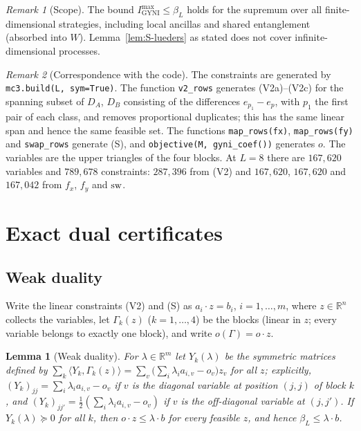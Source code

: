 \documentclass[aps,pra,onecolumn,notitlepage,superscriptaddress,longbibliography,nofootinbib,11pt]{revtex4-2}
\newtheorem{lemma}{Lemma}
\theoremstyle{remark}
\newtheorem{remark}{Remark}
\newcommand{\RR}{\mathbb{R}}
\newcommand{\Imax}{I_{\mathrm{GYNI}}^{\max}}
\newcommand{\file}[1]{\texttt{#1}}
\begin{document}
\begin{remark}[Scope]
The bound $\Imax\le\beta_L$ holds for the supremum over all finite-dimensional strategies, including local ancillas and shared entanglement (absorbed into $W$). Lemma~\ref{lem:S-lueders} as stated does not cover infinite-dimensional processes.
\end{remark}

\begin{remark}[Correspondence with the code]\label{rem:code}
The constraints are generated by \file{mc3.build(L, sym=True)}. The function \file{v2\_rows} generates (V2a)--(V2c) for the spanning subset of $D_A$, $D_B$ consisting of the differences $e_{p_1}-e_p$, with $p_1$ the first pair of each class, and removes proportional duplicates; this has the same linear span and hence the same feasible set. The functions \file{map\_rows(fx)}, \file{map\_rows(fy)} and \file{swap\_rows} generate (S), and \file{objective(M, gyni\_coef())} generates $o$. The variables are the upper triangles of the four blocks. At $L=8$ there are $167{,}620$ variables and $789{,}678$ constraints: $287{,}396$ from (V2) and $167{,}620$, $167{,}620$ and $167{,}042$ from $f_x$, $f_y$ and ${\rm sw}$.
\end{remark}

\section{Exact dual certificates}\label{sec:certificates}

\subsection{Weak duality}

Write the linear constraints (V2) and (S) as $a_i\cdot z=b_i$, $i=1,\dots,m$, where $z\in\RR^n$ collects the variables, let $\Gamma_k(z)$ ($k=1,\dots,4$) be the blocks (linear in $z$; every variable belongs to exactly one block), and write $o(\Gamma)=o\cdot z$.

\begin{lemma}[Weak duality]\label{lem:S-weakdual}
For $\lambda\in\RR^m$ let $Y_k(\lambda)$ be the symmetric matrices defined by $\sum_k\langle Y_k,\Gamma_k(z)\rangle=\sum_v\big(\sum_i\lambda_ia_{i,v}-o_v\big)z_v$ for all $z$; explicitly, $(Y_k)_{jj}=\sum_i\lambda_ia_{i,v}-o_v$ if $v$ is the diagonal variable at position $(j,j)$ of block $k$, and $(Y_k)_{jj'}=\frac12(\sum_i\lambda_ia_{i,v}-o_v)$ if $v$ is the off-diagonal variable at $(j,j')$. If $Y_k(\lambda)\succeq0$ for all $k$, then $o\cdot z\le\lambda\cdot b$ for every feasible $z$, and hence $\beta_L\le\lambda\cdot b$.
\end{lemma}
\end{document}
